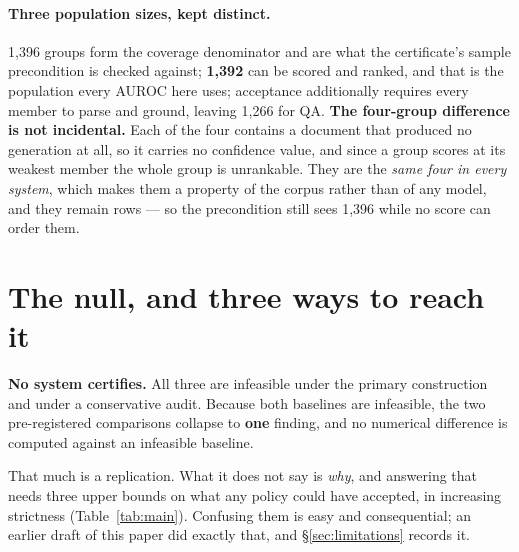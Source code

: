 \documentclass[11pt]{article}
\begin{document}
\paragraph{Three population sizes, kept distinct.} 1{,}396 groups form the coverage denominator and
are what the certificate's sample precondition is checked against; \textbf{1{,}392} can be scored
and ranked, and that is the population every AUROC here uses; acceptance additionally requires
every member to parse and ground, leaving 1{,}266 for QA. \textbf{The four-group difference is not
incidental.} Each of the four contains a document that produced no generation at all, so it carries
no confidence value, and since a group scores at its weakest member the whole group is unrankable.
They are the \emph{same four in every system}, which makes them a property of the corpus rather
than of any model, and they remain rows --- so the precondition still sees 1{,}396 while no score
can order them.

\section{The null, and three ways to reach it}
\label{sec:three}

\textbf{No system certifies.} All three are infeasible under the primary construction and under a
conservative audit. Because both baselines are infeasible, the two pre-registered comparisons
collapse to \textbf{one} finding, and no numerical difference is computed against an infeasible
baseline.

That much is a replication. What it does not say is \emph{why}, and answering that needs three
upper bounds on what any policy could have accepted, in increasing strictness
(Table~\ref{tab:main}). Confusing them is easy and consequential; an earlier draft of this paper
did exactly that, and \S\ref{sec:limitations} records it.
\end{document}
